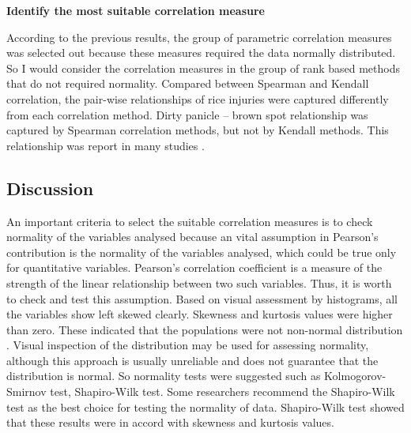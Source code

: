 \textbf{Identify the most suitable correlation measure}

According to the previous results, the group of parametric correlation measures was selected out because these measures required the data normally distributed. So I would consider the correlation measures in the group of rank based methods that do not required normality. Compared between Spearman and Kendall correlation, the pair-wise relationships of rice injuries were captured differently from each correlation method. Dirty panicle – brown spot relationship was captured by Spearman correlation methods, but not by Kendall methods. This relationship was report in many studies \citep{Ou_1985_Rice,Barnwal_2013_Review}.

\subsection{Discussion}

An important criteria to select the suitable correlation measures is to check normality of the variables analysed because an vital assumption in Pearson’s contribution is the normality of the variables analysed, which could be true only for quantitative variables. Pearson’s correlation coefficient is a measure of the strength of the linear relationship between two such variables. Thus, it is worth to check and test this assumption. Based on visual assessment by histograms, all the variables show left skewed clearly. Skewness and kurtosis values were higher than zero. These indicated that the populations were not non-normal distribution \citet{Doane_2011_Measuring}. Visual inspection of the distribution may be used for assessing normality, although this approach is usually unreliable and does not guarantee that the distribution is normal\citep{Ghasemi_2012_Normality}. So normality tests were suggested such as Kolmogorov-Smirnov test, Shapiro-Wilk test. Some researchers recommend the Shapiro-Wilk test as the best choice for testing the normality of data\citep{Peat_2005_Guide}. Shapiro-Wilk test showed that these results were in accord with skewness and kurtosis values.

